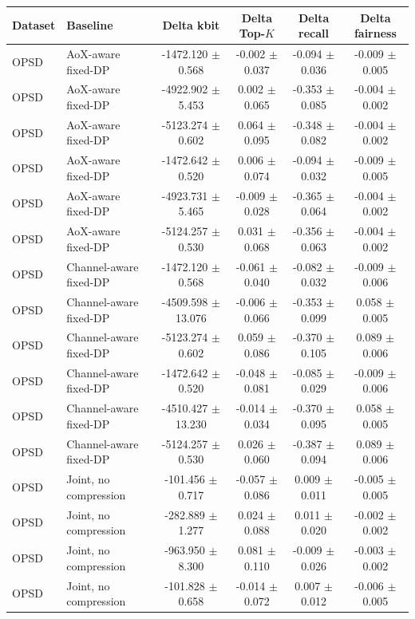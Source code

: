 \begin{tabular}{llcccc}
\toprule
Dataset & Baseline & Delta kbit & Delta Top-$K$ & Delta recall & Delta fairness \\
\midrule
OPSD & AoX-aware fixed-DP & -1472.120 $\pm$ 0.568 & -0.002 $\pm$ 0.037 & -0.094 $\pm$ 0.036 & -0.009 $\pm$ 0.005 \\
OPSD & AoX-aware fixed-DP & -4922.902 $\pm$ 5.453 & 0.002 $\pm$ 0.065 & -0.353 $\pm$ 0.085 & -0.004 $\pm$ 0.002 \\
OPSD & AoX-aware fixed-DP & -5123.274 $\pm$ 0.602 & 0.064 $\pm$ 0.095 & -0.348 $\pm$ 0.082 & -0.004 $\pm$ 0.002 \\
OPSD & AoX-aware fixed-DP & -1472.642 $\pm$ 0.520 & 0.006 $\pm$ 0.074 & -0.094 $\pm$ 0.032 & -0.009 $\pm$ 0.005 \\
OPSD & AoX-aware fixed-DP & -4923.731 $\pm$ 5.465 & -0.009 $\pm$ 0.028 & -0.365 $\pm$ 0.064 & -0.004 $\pm$ 0.002 \\
OPSD & AoX-aware fixed-DP & -5124.257 $\pm$ 0.530 & 0.031 $\pm$ 0.068 & -0.356 $\pm$ 0.063 & -0.004 $\pm$ 0.002 \\
OPSD & Channel-aware fixed-DP & -1472.120 $\pm$ 0.568 & -0.061 $\pm$ 0.040 & -0.082 $\pm$ 0.032 & -0.009 $\pm$ 0.006 \\
OPSD & Channel-aware fixed-DP & -4509.598 $\pm$ 13.076 & -0.006 $\pm$ 0.066 & -0.353 $\pm$ 0.099 & 0.058 $\pm$ 0.005 \\
OPSD & Channel-aware fixed-DP & -5123.274 $\pm$ 0.602 & 0.059 $\pm$ 0.086 & -0.370 $\pm$ 0.105 & 0.089 $\pm$ 0.006 \\
OPSD & Channel-aware fixed-DP & -1472.642 $\pm$ 0.520 & -0.048 $\pm$ 0.081 & -0.085 $\pm$ 0.029 & -0.009 $\pm$ 0.006 \\
OPSD & Channel-aware fixed-DP & -4510.427 $\pm$ 13.230 & -0.014 $\pm$ 0.034 & -0.370 $\pm$ 0.095 & 0.058 $\pm$ 0.005 \\
OPSD & Channel-aware fixed-DP & -5124.257 $\pm$ 0.530 & 0.026 $\pm$ 0.060 & -0.387 $\pm$ 0.094 & 0.089 $\pm$ 0.006 \\
OPSD & Joint, no compression & -101.456 $\pm$ 0.717 & -0.057 $\pm$ 0.086 & 0.009 $\pm$ 0.011 & -0.005 $\pm$ 0.005 \\
OPSD & Joint, no compression & -282.889 $\pm$ 1.277 & 0.024 $\pm$ 0.088 & 0.011 $\pm$ 0.020 & -0.002 $\pm$ 0.002 \\
OPSD & Joint, no compression & -963.950 $\pm$ 8.300 & 0.081 $\pm$ 0.110 & -0.009 $\pm$ 0.026 & -0.003 $\pm$ 0.002 \\
OPSD & Joint, no compression & -101.828 $\pm$ 0.658 & -0.014 $\pm$ 0.072 & 0.007 $\pm$ 0.012 & -0.006 $\pm$ 0.005 \\

\end{tabular}
